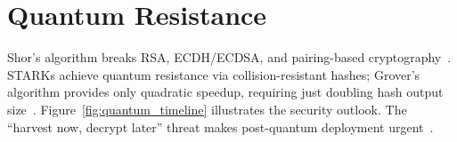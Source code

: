 \documentclass[sigconf,nonacm]{acmart}
\begin{document}
\section{Quantum Resistance}
\label{sec:quantum}

Shor's algorithm breaks RSA, ECDH/ECDSA, and pairing-based
cryptography~\cite{quantum_threat_2023}. STARKs achieve quantum resistance via
collision-resistant hashes; Grover's algorithm provides only quadratic speedup,
requiring just doubling hash output size~\cite{hash_security_2023,grover_analysis_2024}.
Figure~\ref{fig:quantum_timeline} illustrates the security outlook. The ``harvest now,
decrypt later'' threat makes post-quantum deployment urgent~\cite{harvest_threat_2024}.

\end{document}
